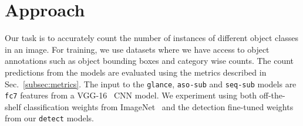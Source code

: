 \documentclass[10pt,twocolumn,letterpaper]{article}
\newcommand{\detect}{\texttt{detect}\xspace}
\newcommand{\sub}{\texttt{aso-sub}\xspace}
\newcommand{\seq}{\texttt{seq-sub}\xspace}
\newcommand{\glance}{\texttt{glance}\xspace}
\begin{document}
\begin{comment}
Counting crowds of people
\begin{itemize}
\item Bayesian Poisson Regression for Crowd Counting~\cite{add} and 
Privacy preserving crowd monitoring: Counting people without people models or tracking~\cite{add}
\item Lempitsky and Zisserman~\cite{Lempitsky2010} propose to avoid detecting objects to count them by estimating object density using low level features
\item Fiaschi \etal~\cite{add} improve upon their method by using random forests to regress to training density
\item These density based methods work well for scene specific surveilance videos, but do not generalize well to surveilance videos of novel scenes
\item Zhang \etal~\cite{Zhang2015} count crowds of people by using CNNs. Their approach involves predicting a density map and a count value jointly
\item Segui and Pujol~\cite{Segui2015} study how counting can serve as weak supervision to learn features that generalize across tasks on MNIST and a pedestrian dataset
\item While these methods work in the restricted domain of surveilance videos/ biological data, we are interested in counting everyday objects in everyday scenes. 
\item Similar to these approaches, we incorporate a notion of density in our smart associative subitizing model
\end{itemize}



Other counting problems
\begin{itemize}
\item Salient object subitizing
\item Unlike this method, we are interested in counts for all objects of a given category in the scene
\item makes the problem more challenging
\item Counts can vary from 0 to 35
\end{itemize}
\end{comment}
 
\section{Approach}\label{sec:approach}
Our task is to accurately count the number of instances of different object classes in an image. For training, we use datasets where we have access to object annotations such as object bounding boxes and category wise counts. The count predictions from the models are evaluated using the metrics described in Sec.~\ref{subsec:metrics}.
The input to the \glance, \sub and \seq models are \texttt{fc7} features from a VGG-16~\cite{Simonyan2014VeryRecognition} CNN model. We experiment using both off-the-shelf classification weights from ImageNet~\cite{ILSVRC15} and the detection fine-tuned weights from our \detect models.
\end{document}
